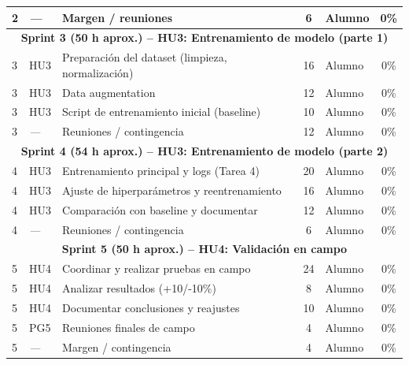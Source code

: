 \documentclass[
11pt, %
]{ProyectoVpC}
\begin{document}
\begin{center}
\begin{tabular}{|l|l|l|c|l|c|}
2 & \textit{---} & Margen / reuniones & 6 & Alumno & 0\% \\
\hline
\multicolumn{6}{|c|}{\textbf{Sprint 3 (50 h aprox.) -- HU3: Entrenamiento de modelo (parte 1)}} \\
\hline
3 & HU3 & Preparación del dataset (limpieza, normalización) & 16 & Alumno & 0\% \\
3 & HU3 & Data augmentation & 12 & Alumno & 0\% \\
3 & HU3 & Script de entrenamiento inicial (baseline) & 10 & Alumno & 0\% \\
3 & \textit{---} & Reuniones / contingencia & 12 & Alumno & 0\% \\
\hline
\multicolumn{6}{|c|}{\textbf{Sprint 4 (54 h aprox.) -- HU3: Entrenamiento de modelo (parte 2)}} \\
\hline
4 & HU3 & Entrenamiento principal y logs (Tarea 4) & 20 & Alumno & 0\% \\
4 & HU3 & Ajuste de hiperparámetros y reentrenamiento & 16 & Alumno & 0\% \\
4 & HU3 & Comparación con baseline y documentar & 12 & Alumno & 0\% \\
4 & \textit{---} & Reuniones / contingencia & 6 & Alumno & 0\% \\
\hline
\multicolumn{6}{|c|}{\textbf{Sprint 5 (50 h aprox.) -- HU4: Validación en campo}} \\
\hline
5 & HU4 & Coordinar y realizar pruebas en campo & 24 & Alumno & 0\% \\
5 & HU4 & Analizar resultados (+10/-10\%) & 8 & Alumno & 0\% \\
5 & HU4 & Documentar conclusiones y reajustes & 10 & Alumno & 0\% \\
5 & PG5 & Reuniones finales de campo & 4 & Alumno & 0\% \\
5 & \textit{---} & Margen / contingencia & 4 & Alumno & 0\% \\
\hline
\end{tabular}


\end{center}
\end{document}
